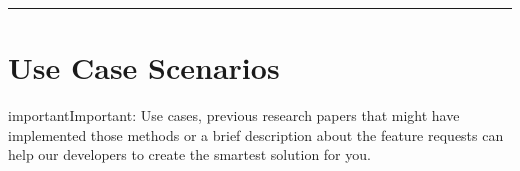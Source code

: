 \documentclass[letterpaper,10pt,english]{sphinxmanual}
\begin{document}
\bigskip\hrule\bigskip



\section{Use Case Scenarios}
\label{\detokenize{7_issues_bugs_requests:use-case-scenarios}}
\begin{sphinxadmonition}{important}{Important:}
\sphinxAtStartPar
Use cases, previous research papers that might have implemented those methods or a brief description about the feature requests can help our developers to create the smartest solution for you.
\end{sphinxadmonition}



\renewcommand{\indexname}{Index}
\printindex
\end{document}
